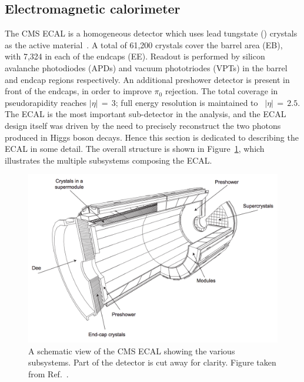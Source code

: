 \subsection{Electromagnetic calorimeter}
\label{sec:detector_ECAL}

The CMS ECAL is a homogeneous detector which uses lead tungstate (\pbw) crystals as the active material~\cite{CMSdetector,ECALperformance}.
A total of 61,200 crystals cover the barrel area (EB), with 7,324 in each of the endcaps (EE).
Readout is performed by silicon avalanche photodiodes (APDs) and vacuum phototriodes (VPTs) in the barrel and endcap regions respectively.
An additional preshower detector is present in front of the endcaps, in order to improve $\pi_0$ rejection.
The total coverage in pseudorapidity reaches $|\eta|\,=\,3$; full energy resolution is maintained to ~$|\eta|\,=\,2.5$.
The ECAL is the most important sub-detector in the \Hgg analysis, 
and the ECAL design itself was driven by the need to precisely reconstruct the two photons produced in Higgs boson decays.
Hence this section is dedicated to describing the ECAL in some detail.
The overall structure is shown in Figure~\ref{fig:detector_ECALschematic}, 
which illustrates the multiple subsystems composing the ECAL.

\begin{figure}[h!]
  \centering
  \includegraphics[width=\textwidth]{Figures/Detector/ECALschematic.png}
  \caption[Schematic view of the CMS ECAL.]
  {
    A schematic view of the CMS ECAL showing the various subsystems.
    Part of the detector is cut away for clarity.
    Figure taken from Ref.~\cite{ECALperformance}.
  }
  \label{fig:detector_ECALschematic}
\end{figure}

